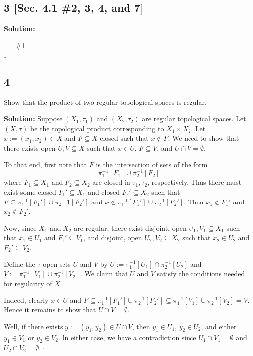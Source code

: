 \documentclass[12pt]{article}
\newcounter{ProofCounter}
\newenvironment{Solution}{\stepcounter{ProofCounter}\textbf{Solution:}}{\hfill$\square$}
\begin{document}
\subsection*{3 [Sec. 4.1 \#2, 3, 4, and 7]}
\begin{Solution}
  \begin{enumerate}
    \item[\#1.] 
  \end{enumerate}
\end{Solution}

\subsection*{4} 
\begin{tcolorbox}
  Show that the product of two regular topological spaces is regular.
\end{tcolorbox}
\begin{Solution}
  Suppose $(X_1, \tau_1)$ and $(X_2, \tau_2)$ are regular topological spaces. Let $(X, \tau)$ be the topological product corresponding to $X_1 \times
  X_2$. Let $x := (x_1, x_2) \in X$ and $F \subseteq X$ closed such that $x \notin F$. We need to show that there exists open $U, V \subseteq X$ such
  that $x \in U$, $F \subseteq V$, and $U \cap V = \emptyset$. 
  
  To that end, first note that $F$ is the intersection of sets of the form 
  \[
    \pi_1^{-1}[F_1] \cup \pi_2^{-1}[F_2]
  \]
  where $F_1 \subseteq X_1$ and $F_2 \subseteq X_2$ are closed in $\tau_1, \tau_2$, respectively. Thus there must exist some closed $F_1' \subseteq X_1$ and
  closed $F_2' \subseteq X_2$ such that $F \subseteq \pi_1^{-1}[F_1'] \cup \pi_2{-1}[F_2']$ and $x \notin \pi_1^{-1}[F_1'] \cup \pi_2^{-1}[F_2']$.
  Then $x_1 \notin F_1'$ and $x_2 \notin F_2'$. 
  
  Now, since $X_1$ and $X_2$ are regular, there exist disjoint, open $U_1, V_1 \subseteq X_1$ 
  such that $x_1 \in U_1$ and $F_1' \subseteq V_1$, and disjoint, open $U_2, V_2 \subseteq X_2$ such that 
  $x_2 \in U_2$ and $F_2' \subseteq V_2$. 

  Define the $\tau$-open sets $U$ and $V$ by $U := \pi_1^{-1}[U_1] \cap \pi_2^{-1}[U_2]$ and 
  $V := \pi_1^{-1}[V_1] \cup \pi_2^{-1}[V_2]$. We claim that $U$ and $V$ satisfy the conditions needed for regularity of $X$. 
  
  Indeed, clearly $x \in
  U$ and $F \subseteq \pi_{1}^{-1}[F_1'] \cup \pi_2^{-1}[F_2'] \subseteq \pi_1^{-1}[V_1] \cup \pi_2^{-1}[V_2] = V$. Hence it remains to show that $U
  \cap V = \emptyset$.

  Well, if there exists $y := (y_1, y_2) \in U \cap V$, then $y_1 \in U_1$, $y_2 \in U_2$, and either $y_1 \in V_1$ or $y_2 \in V_2$. In either case,
  we have a contradiction since $U_1 \cap V_1 = \emptyset$ and $U_2 \cap V_2 = \emptyset$.
\end{Solution}
\end{document}
